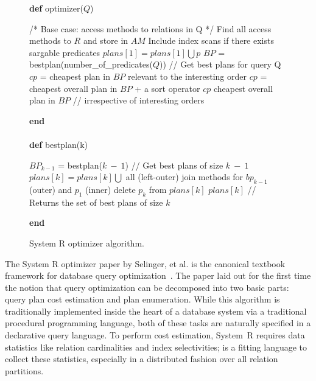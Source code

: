 \begin{figure*}
\ssp
\centering
\begin{boxedminipage}{\linewidth}
  {\bf def} optimizer($Q$)
    \begin{algorithmic}[1]
      	\STATE /* Base case: access methods to relations in Q */
		\STATE Find all access methods to $R$ and store in $AM$
		\STATE Include index scans if there exists sargable predicates 
  	\ENDFOR
	\STATE
			\STATE $plans[1] = plans[1] \bigcup p$ 
		\ENDIF
 	\ENDFOR
	\STATE
	\STATE $BP$ = bestplan(number\_of\_predicates($Q$)) // Get best plans for query Q 
	 	\STATE $cp$ = cheapest plan in $BP$ relevant to the interesting order 
			\STATE $cp$ = cheapest overall plan in $BP$ + a sort operator
		\ENDIF
		\RETURN $cp$
	\ELSE
	 	\RETURN cheapest overall plan in $BP$ // irrespective of interesting orders
	\ENDIF
    \end{algorithmic}
  {\bf end} \\
  \\
  {\bf def} bestplan(k)
    \begin{algorithmic}[1]
			\STATE $BP_{k-1}$ = bestplan($k\ -\ 1$) // Get best plans of size $k\ -\ 1$
				\STATE $plans[k] = plans[k] \bigcup$ all (left-outer) join methods 
				       for $bp_{k-1}$ (outer) and $p_1$ (inner)
			\ENDIF
			\ENDFOR
		\ENDFOR
		\STATE
				\STATE delete $p_k$ from $plans[k]$
			\ENDIF
		\ENDFOR
	\ENDIF
	\RETURN $plans[k]$ // Returns the set of best plans of size $k$
      \end{algorithmic}
    {\bf end}
\end{boxedminipage}
\caption{\label{ch:opt:fig:systemr}System R optimizer algorithm.}
\end{figure*}

The System R optimizer paper by Selinger, et al.  is the canonical textbook
framework for database query optimization~\cite{selinger}.  The paper laid out
for the first time the notion that query optimization can be decomposed into
two basic parts: query plan cost estimation and plan enumeration.  While this
algorithm is traditionally implemented inside the heart of a database system
via a traditional procedural programming language, both of these tasks are
naturally specified in a declarative query language.  To perform cost
estimation, System~R requires data statistics like relation cardinalities and
index selectivities; \OVERLOG is a fitting language to collect these
statistics, especially in a distributed fashion over all relation partitions.

